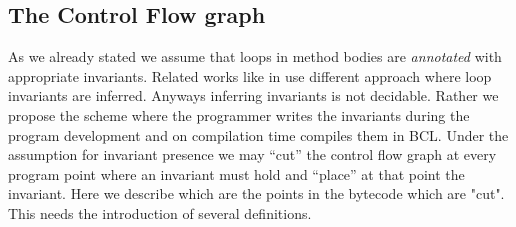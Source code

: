 
\subsection{The Control Flow graph}\label{abstrCntrFlow}
As we  already stated we assume that loops in method bodies are  \textit{annotated} with appropriate invariants. 
Related works like in \cite{WildmoserN-ESOP05} use different approach where loop invariants are inferred. Anyways inferring invariants is not decidable. 
Rather we propose the scheme where the programmer writes the invariants during the program development  
and on compilation time compiles them in BCL. Under the assumption for invariant presence we may ``cut'' the control flow graph at every program point
where an invariant must hold and ``place'' at that point the invariant. Here we describe which are the points in the bytecode which are "cut". This needs the introduction
of several definitions.
     
